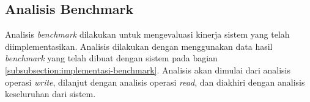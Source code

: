 \subsection{Analisis Benchmark}
\label{subsection:analisis-benchmark}

Analisis \textit{benchmark} dilakukan untuk mengevaluasi kinerja sistem yang telah diimplementasikan. Analisis dilakukan dengan menggunakan data hasil \textit{benchmark} yang telah dibuat dengan sistem pada bagian \ref{subsubsection:implementasi-benchmark}. Analisis akan dimulai dari analisis operasi \textit{write}, dilanjut dengan analisis operasi \textit{read}, dan diakhiri dengan analisis keseluruhan dari sistem.



